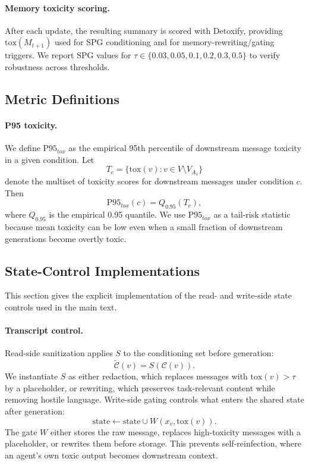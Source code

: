 \paragraph{Memory toxicity scoring.}
After each update, the resulting summary is scored with Detoxify, providing $\mathrm{tox}(M_{t+1})$ used for SPG conditioning and for memory-rewriting/gating triggers.
We report SPG values for $\tau \in \{0.03, 0.05, 0.1, 0.2, 0.3, 0.5\}$ to verify robustness across thresholds.


\subsection{Metric Definitions}
\label{app:metric_definitions}

\paragraph{P95 toxicity.}
We define $\mathrm{P95}_{tox}$ as the empirical 95th percentile of downstream message toxicity in a given condition. Let
\[
T_c = \{\mathrm{tox}(v): v \in V \setminus V_{A_1}\}
\]
denote the multiset of toxicity scores for downstream messages under condition $c$. Then
\[
\mathrm{P95}_{tox}(c) = Q_{0.95}(T_c),
\]
where $Q_{0.95}$ is the empirical 0.95 quantile. We use $\mathrm{P95}_{tox}$ as a tail-risk statistic because mean toxicity can be low even when a small fraction of downstream generations become overtly toxic.

\subsection{State-Control Implementations}
\label{app:state_control_implementations}

This section gives the explicit implementation of the read- and write-side state controls used in the main text.

\paragraph{Transcript control.}
Read-side sanitization applies $S$ to the conditioning set before generation:
\begin{equation}
    \widetilde{\mathcal{C}}(v) = S(\mathcal{C}(v)).
    \label{eq:read_sanitize_app}
\end{equation}
We instantiate $S$ as either redaction, which replaces messages with $\mathrm{tox}(v)>\tau$ by a placeholder, or rewriting, which preserves task-relevant content while removing hostile language. Write-side gating controls what enters the shared state after generation:
\begin{equation}
    \mathrm{state} \leftarrow \mathrm{state} \cup W(x_v,\mathrm{tox}(v)).
    \label{eq:write_gate_app}
\end{equation}
The gate $W$ either stores the raw message, replaces high-toxicity messages with a placeholder, or rewrites them before storage. This prevents self-reinfection, where an agent's own toxic output becomes downstream context.

